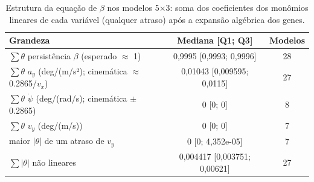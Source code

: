 \begin{table}[htbp]
    \centering
    \caption{Estrutura da equação de $\beta$ nos modelos 5×3: soma dos coeficientes dos monômios lineares de cada variável (qualquer atraso) após a expansão algébrica dos genes.}
    \label{tab:estrutura_beta}
    \footnotesize
    \begin{tabular}{p{7.2cm}cc}
        \toprule
        \textbf{Grandeza} & \textbf{Mediana [Q1; Q3]} & \textbf{Modelos} \\
        \midrule
        $\sum\theta$ persistência $\beta$ (esperado $\approx$ 1) & 0,9995 [0,9993; 0,9996] & 28 \\
        $\sum\theta$ $a_y$ (deg/(m/s²); cinemática $\approx$ 0.2865/$v_x$) & 0,01043 [0,009595; 0,0115] & 27 \\
        $\sum\theta$ $\dot\psi$ (deg/(rad/s); cinemática $\pm$0.2865) & 0 [0; 0] & 8 \\
        $\sum\theta$ $v_y$ (deg/(m/s)) & 0 [0; 0] & 7 \\
        maior $|\theta|$ de um atraso de $v_y$ & 0 [0; 4,352e-05] & 7 \\
        $\sum|\theta|$ não lineares & 0,004417 [0,003751; 0,00621] & 27 \\
        \bottomrule
    \end{tabular}
\end{table}
